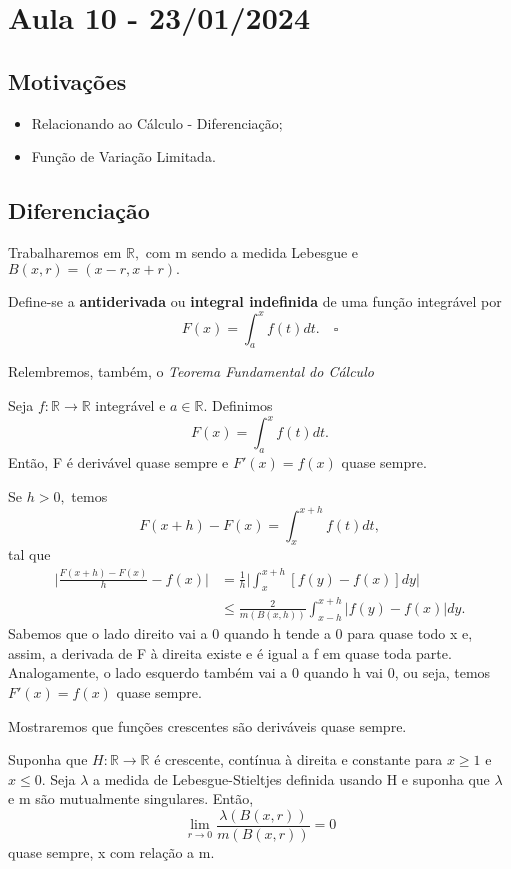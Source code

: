 \documentclass[measure_theory.tex]{subfiles}
\begin{document}
\section{Aula 10 - 23/01/2024}
\subsection{Motivações}
\begin{itemize}
	\item Relacionando ao Cálculo - Diferenciação;
	\item Função de Variação Limitada.
\end{itemize}
\subsection{Diferenciação}
Trabalharemos em \(\mathbb{R},\) com m sendo a medida Lebesgue e \(B(x, r) = (x-r, x+r).\)
\begin{def*}
	Define-se a \textbf{antiderivada} ou \textbf{integral indefinida} de uma função integrável por
	\[
		F(x) = \int_{a}^{x}f(t)dt.\quad \square
	\]
\end{def*}
Relembremos, também, o \textit{Teorema Fundamental do Cálculo}
\hypertarget{calculus}{\begin{theorem*}
		Seja \(f:\mathbb{R}\rightarrow \mathbb{R}\) integrável e \(a\in \mathbb{R}.\) Definimos
		\[
			F(x) = \int_{a}^{x}f(t)dt.
		\]
		Então, F é derivável quase sempre e \(F'(x) = f(x)\) quase sempre.
	\end{theorem*}}
\begin{proof*}
	Se \(h > 0,\) temos
	\[
		F(x+h) - F(x) = \int_{x}^{x+h}f(t)dt,
	\]
	tal que
	\begin{align*}
		\biggl\vert \frac{F(x+h) - F(x)}{h} - f(x) \biggr\vert & = \frac{1}{h}\biggl\vert \int_{x}^{x+h}[f(y) - f(x)]dy \biggr\vert \\
		                                                       & \leq \frac{2}{m(B(x, h))}\int_{x-h}^{x+h}|f(y) - f(x)|dy.
	\end{align*}
	Sabemos que o lado direito vai a 0 quando h tende a 0 para quase todo x e, assim, a derivada de F à direita existe e é igual a f em quase toda parte. Analogamente, o lado esquerdo também vai a 0 quando h vai 0, ou seja, temos
	\(F'(x) = f(x)\) quase sempre. \qedsymbol
\end{proof*}
Mostraremos que funções crescentes são deriváveis quase sempre.
\begin{lemma*}
	Suponha que \(H:\mathbb{R}\rightarrow \mathbb{R}\) é crescente, contínua à direita e constante para \(x\geq 1\) e \(x\leq 0.\) Seja \(\lambda \) a medida de Lebesgue-Stieltjes definida usando H e suponha que \(\lambda \) e m são mutualmente singulares. Então,
	\[
		\lim_{r\to 0}\frac{\lambda (B(x, r))}{m(B(x, r))} = 0
	\]
	quase sempre, x com relação a m.
\end{lemma*}
\end{document}
